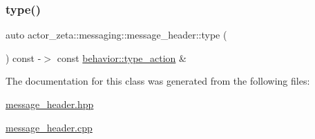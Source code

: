 \mbox{\label{classactor__zeta_1_1messaging_1_1message__header_a641b7784a94157d575c1a8099a477cf1}} 
\subsubsection{\texorpdfstring{type()}{type()}}
{\footnotesize\ttfamily auto actor\+\_\+zeta\+::messaging\+::message\+\_\+header\+::type (\begin{DoxyParamCaption}{ }\end{DoxyParamCaption}) const -\/$>$ const \hyperlink{classactor__zeta_1_1behavior_1_1type__action}{behavior\+::type\+\_\+action} \&\hspace{0.3cm}{\ttfamily [noexcept]}}



The documentation for this class was generated from the following files\+:\begin{DoxyCompactItemize}
\item 
\hyperlink{message__header_8hpp}{message\+\_\+header.\+hpp}\item 
\hyperlink{message__header_8cpp}{message\+\_\+header.\+cpp}\end{DoxyCompactItemize}
